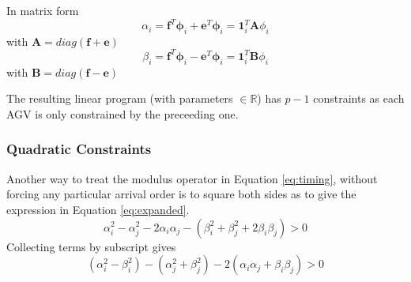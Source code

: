 In matrix form
\begin{equation}
\alpha_i  = \bm{f}^T \bm{\phi}_i + \bm{e}^T \bm{\phi}_i = \bm{1}_i^T\bm{A}{\phi}_i
\label{eq:alpha_m}
\end{equation}
with $\bm{A} = diag(\bm{f} + \bm{e})$
\begin{equation}
\beta_i  = \bm{f}^T \bm{\phi}_i - \bm{e}^T \bm{\phi}_i =  \bm{1}_i^T\bm{B}{\phi}_i
\label{eq:beta_m}
\end{equation}
with $\bm{B} = diag(\bm{f} - \bm{e})$

The resulting linear program (with parameters $\in\mathbb{R}$) has $p-1$ constraints as each AGV is only constrained by the preceeding one.

\subsubsection{Quadratic Constraints}
\label{sec:quad_constraints}
Another way to treat the modulus operator in Equation \ref{eq:timing}, without forcing any particular arrival order is to square both sides as to give the expression in Equation \ref{eq:expanded}. 
\begin{equation}
\alpha_i^2 - \alpha_j^2 - 2 \alpha_i\alpha_j - (\beta_i^2 + \beta_j^2 +2 \beta_i \beta_j) > 0
\label{eq:expanded}
\end{equation}
Collecting terms by subscript gives
\begin{equation}
(\alpha_i^2 - \beta_i^2) - (\alpha_j^2 + \beta_j^2) - 2(\alpha_i\alpha_j + \beta_i \beta_j) > 0
\label{eq:collected}
\end{equation}


